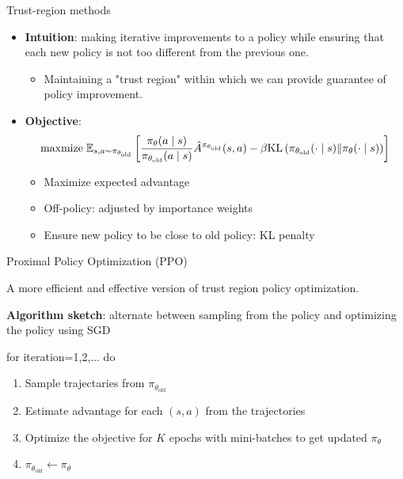 \documentclass[usenames,dvipsnames,notes,11pt,aspectratio=169,hyperref={colorlinks=true, linkcolor=blue}]{beamer}
\begin{document}
\begin{frame}
    {Trust-region methods}
    \begin{itemize}
        \item {\bf Intuition}: making iterative improvements to a policy while ensuring that each new policy is not too different from the previous one.
        \begin{itemize}
            \item Maintaining a "trust region" within which we can provide guarantee of policy improvement.
        \end{itemize}
            \pause
        \item {\bf Objective}: 
            \begin{align*}
                \mathrm{maxmize}\; \mathbb{E}_{s, a \sim \pi_{\theta_\text{old}}} \left[ \frac{\pi_\theta(a\mid s)}{\pi_{\theta_\text{old}}(a\mid s)} \hat{A}^{\pi_{\theta_\text{old}}}(s, a) 
                - \beta \text{KL}\left( \pi_{\theta_\text{old}}(\cdot\mid s) \| \pi_{\theta}(\cdot\mid s) \right)
                \right] 
            \end{align*}
            \begin{itemize}
                \item Maximize expected advantage
                \item Off-policy: adjusted by importance weights
                \item Ensure new policy to be close to old policy: KL penalty
            \end{itemize}
    \end{itemize}
\end{frame}

\begin{frame}
    {Proximal Policy Optimization (PPO)}

    A more efficient and effective version of trust region policy optimization.

    {\bf Algorithm sketch}: alternate between sampling from the policy and optimizing the policy using SGD

            for iteration=1,2,... do\\
            \begin{enumerate}
                \item Sample trajectaries from $\pi_{\theta_\text{old}}$
                \item Estimate advantage for each $(s,a)$ from the trajectories
                \item Optimize the objective for $K$ epochs with mini-batches to get updated $\pi_\theta$
                \item $\pi_{\theta_\text{old}} \leftarrow \pi_\theta$
            \end{enumerate}
\end{frame}
\end{document}

